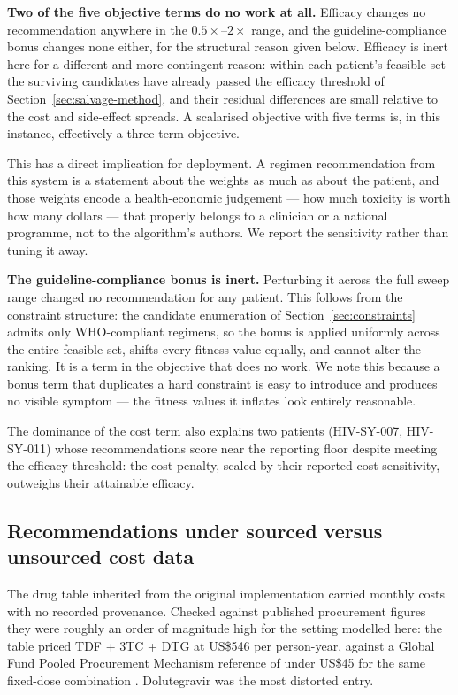 \documentclass[conference]{IEEEtran}
\begin{document}
\textbf{Two of the five objective terms do no work at all.} Efficacy changes no recommendation anywhere in the $0.5\times$--$2\times$ range, and the guideline-compliance bonus changes none either, for the structural reason given below. Efficacy is inert here for a different and more contingent reason: within each patient's feasible set the surviving candidates have already passed the efficacy threshold of Section~\ref{sec:salvage-method}, and their residual differences are small relative to the cost and side-effect spreads. A scalarised objective with five terms is, in this instance, effectively a three-term objective.

This has a direct implication for deployment. A regimen recommendation from this system is a statement about the weights as much as about the patient, and those weights encode a health-economic judgement --- how much toxicity is worth how many dollars --- that properly belongs to a clinician or a national programme, not to the algorithm's authors. We report the sensitivity rather than tuning it away.

\textbf{The guideline-compliance bonus is inert.} Perturbing it across the full sweep range changed no recommendation for any patient. This follows from the constraint structure: the candidate enumeration of Section~\ref{sec:constraints} admits only WHO-compliant regimens, so the bonus is applied uniformly across the entire feasible set, shifts every fitness value equally, and cannot alter the ranking. It is a term in the objective that does no work. We note this because a bonus term that duplicates a hard constraint is easy to introduce and produces no visible symptom --- the fitness values it inflates look entirely reasonable.

The dominance of the cost term also explains two patients (HIV-SY-007, HIV-SY-011) whose recommendations score near the reporting floor despite meeting the efficacy threshold: the cost penalty, scaled by their reported cost sensitivity, outweighs their attainable efficacy.

\subsection{Recommendations under sourced versus unsourced cost data}\label{sec:costs}

The drug table inherited from the original implementation carried monthly costs with no recorded provenance. Checked against published procurement figures they were roughly an order of magnitude high for the setting modelled here: the table priced TDF + 3TC + DTG at US\$546 per person-year, against a Global Fund Pooled Procurement Mechanism reference of under US\$45 for the same fixed-dose combination \cite{globalfund2023}. Dolutegravir was the most distorted entry.
\end{document}

